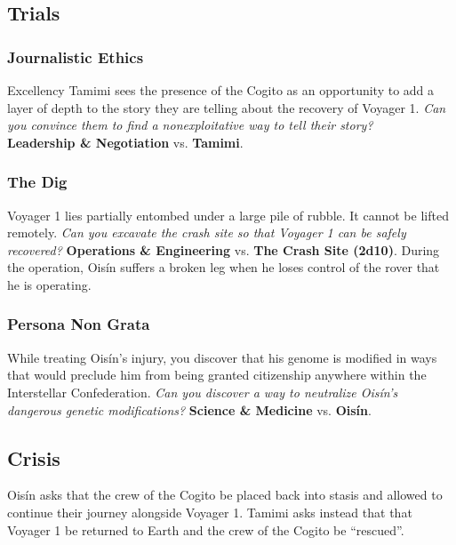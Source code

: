 \documentclass[11pt, a5paper, parskip=half-, DIV=12]{scrartcl}
\begin{document}
\newpage

\subsection*{Trials}
\subsubsection*{Journalistic Ethics}
Excellency Tamimi sees the presence of the Cogito as an opportunity to add a layer of depth to the story they are telling about the recovery of Voyager 1. \textit{Can you convince them to find a nonexploitative way to tell their story?} \\ \textbf{Leadership \& Negotiation} vs. \textbf{Tamimi}.

\subsubsection*{The Dig}
Voyager 1 lies partially entombed under a large pile of rubble. It cannot be lifted remotely. \textit{Can you excavate the crash site so that Voyager 1 can be safely recovered?} \textbf{Operations \& Engineering} vs. \textbf{The Crash Site (2d10)}. During the operation, Ois\'in suffers a broken leg when he loses control of the rover that he is operating.


\subsubsection*{Persona Non Grata}
While treating Ois\'in's injury, you discover that his genome is modified in ways that would preclude him from being granted citizenship anywhere within the Interstellar Confederation. \textit{Can you discover a way to neutralize Ois\'in's dangerous genetic modifications?} \textbf{Science \& Medicine} vs. \textbf{Ois\'in}.

\subsection*{Crisis}
Ois\'in asks that the crew of the Cogito be placed back into stasis and allowed to continue their journey alongside Voyager 1. Tamimi asks instead that that Voyager 1 be returned to Earth and the crew of the Cogito be ``rescued''. 
\end{document}
